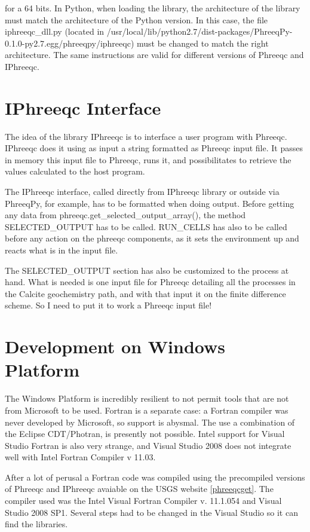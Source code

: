 \documentclass[12pt,a4paper,twoside]{report}
\begin{document}
for a 64 bits. In Python, when loading the library, the architecture of the library must match the architecture of the Python version. In this case, the file iphreeqc\_dll.py (located in /usr/local/lib/python2.7/dist-packages/PhreeqPy-0.1.0-py2.7.egg/phreeqpy/iphreeqc) must be changed to match the right architecture. The same instructions are valid for different versions of Phreeqc and IPhreeqc.


\section{IPhreeqc Interface}
The idea of the library IPhreeqc is to interface a user program with Phreeqc. IPhreeqc does it using as input a string formatted as Phreeqc input file. It passes in memory this input file to Phreeqc, runs it, and possibilitates to retrieve the values calculated to the host program.

The IPhreeqc interface, called directly from IPhreeqc library or outside via PhreeqPy, for example, has to be formatted when doing output. Before getting any data from phreeqc.get\_selected\_output\_array(), the method SELECTED\_OUTPUT has to be called. RUN\_CELLS has also to be called before any action on the phreeqc components, as it sets the environment up and reacts what is in the input file.

The SELECTED\_OUTPUT section has also be customized to the process at hand. What is needed is one input file for Phreeqc detailing all the processes in the Calcite geochemistry path, and with that input it on the finite difference scheme. So I need to put it to work a Phreeqc input file!

\section{Development on Windows Platform}
The Windows Platform is incredibly resilient to not permit tools that are not from Microsoft to be used. Fortran is a separate case: a Fortran compiler was never developed by Microsoft, so support is abysmal. The use a combination of the Eclipse CDT/Photran, is presently not possible. Intel support for Visual Studio Fortran is also very strange, and Visual Studio 2008 does not integrate well with Intel Fortran Compiler v 11.03. 

After a lot of perusal a Fortran code was compiled using the precompiled versions of Phreeqc and IPhreeqc avaiable on the USGS website \eqref{phreeqcget}. The compiler used was the Intel Visual Fortran Compiler v. 11.1.054 and Visual Studio 2008 SP1. Several steps had to be changed in the Visual Studio so it can find the libraries.
\end{document}
